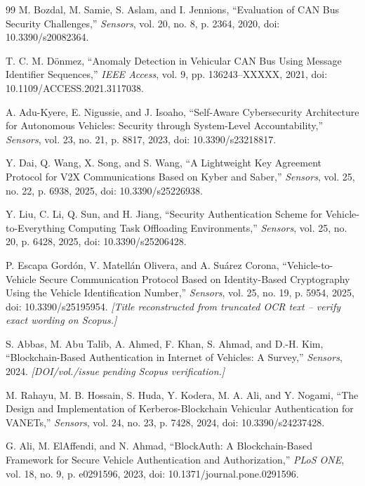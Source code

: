 \documentclass[journal]{IEEEtran}
\begin{document}
\begin{thebibliography}{99}
		 M. Bozdal, M. Samie, S. Aslam, and I. Jennions,
		``Evaluation of CAN Bus Security Challenges,'' \emph{Sensors}, vol. 20,
		no. 8, p. 2364, 2020, doi: 10.3390/s20082364.
		
		 T. C. M. D\"onmez, ``Anomaly Detection in Vehicular CAN Bus
		Using Message Identifier Sequences,'' \emph{IEEE Access}, vol. 9, pp.
		136243--XXXXX, 2021, doi: 10.1109/ACCESS.2021.3117038.
		
		 A. Adu-Kyere, E. Nigussie, and J. Isoaho, ``Self-Aware
		Cybersecurity Architecture for Autonomous Vehicles: Security through
		System-Level Accountability,'' \emph{Sensors}, vol. 23, no. 21, p. 8817,
		2023, doi: 10.3390/s23218817.
		
		 Y. Dai, Q. Wang, X. Song, and S. Wang, ``A Lightweight
		Key Agreement Protocol for V2X Communications Based on Kyber and
		Saber,'' \emph{Sensors}, vol. 25, no. 22, p. 6938, 2025, doi:
		10.3390/s25226938.
		
		 Y. Liu, C. Li, Q. Sun, and H. Jiang, ``Security
		Authentication Scheme for Vehicle-to-Everything Computing Task
		Offloading Environments,'' \emph{Sensors}, vol. 25, no. 20, p. 6428,
		2025, doi: 10.3390/s25206428.
		
		 P. Escapa Gord\'on, V. Matell\'an Olivera, and A.
		Su\'arez Corona, ``Vehicle-to-Vehicle Secure Communication Protocol
		Based on Identity-Based Cryptography Using the Vehicle Identification
		Number,'' \emph{Sensors}, vol. 25, no. 19, p. 5954, 2025, doi:
		10.3390/s25195954. \emph{[Title reconstructed from truncated OCR text
			-- verify exact wording on Scopus.]}
		
		 S. Abbas, M. Abu Talib, A. Ahmed, F. Khan, S. Ahmad,
		and D.-H. Kim, ``Blockchain-Based Authentication in Internet of
		Vehicles: A Survey,'' \emph{Sensors}, 2024. \emph{[DOI/vol./issue
			pending Scopus verification.]}
		
		 M. Rahayu, M. B. Hossain, S. Huda, Y. Kodera, M. A.
		Ali, and Y. Nogami, ``The Design and Implementation of
		Kerberos-Blockchain Vehicular Authentication for VANETs,''
		\emph{Sensors}, vol. 24, no. 23, p. 7428, 2024, doi:
		10.3390/s24237428.
		
		 G. Ali, M. ElAffendi, and N. Ahmad, ``BlockAuth: A
		Blockchain-Based Framework for Secure Vehicle Authentication and
		Authorization,'' \emph{PLoS ONE}, vol. 18, no. 9, p. e0291596, 2023,
		doi: 10.1371/journal.pone.0291596.
		

\end{thebibliography}
\end{document}
